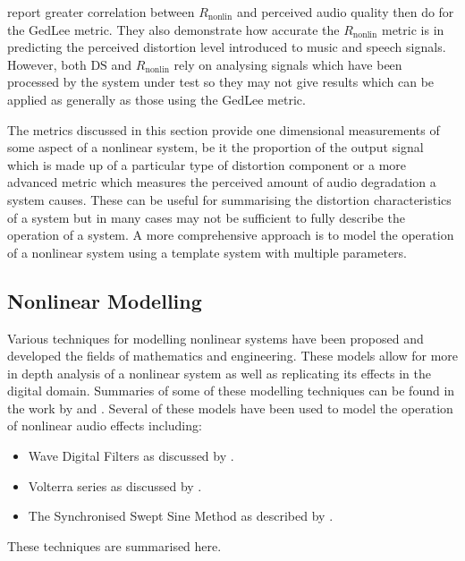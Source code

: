 			\citet{tan2004predicting} report greater correlation between $R_{\mathrm{nonlin}}$ and perceived
			audio quality then \citet{lee2003auditory} do for the GedLee metric. They also demonstrate how
			accurate the $R_{\mathrm{nonlin}}$ metric is in predicting the perceived distortion level introduced
			to music and speech signals. However, both $\mathrm{DS}$ and $R_{\mathrm{nonlin}}$ rely on analysing
			signals which have been processed by the system under test so they may not give results which can be
			applied as generally as those using the GedLee metric.

			The metrics discussed in this section provide one dimensional measurements of some aspect of a
			nonlinear system, be it the proportion of the output signal which is made up of a particular type of
			distortion component or a more advanced metric which measures the perceived amount of audio
			degradation a system causes. These can be useful for summarising the distortion characteristics of a
			system but in many cases may not be sufficient to fully describe the operation of a system. A more
			comprehensive approach is to model the operation of a nonlinear system using a template system with
			multiple parameters.

	\subsection{Nonlinear Modelling}
	\label{sec:Excitation-Analysis-Modelling}
		Various techniques for modelling nonlinear systems have been proposed and developed the fields of
		mathematics and engineering. These models allow for more in depth analysis of a nonlinear system as well as
		replicating its effects in the digital domain. Summaries of some of these modelling techniques can be found
		in the work by \citet{janczak2005identification} and \citet{ogunfunmi2007adaptive}. Several of these models
		have been used to model the operation of nonlinear audio effects including:

		\begin{itemize}
			\item Wave Digital Filters as discussed by \citet{fettweis1986wave}.
			\item Volterra series as discussed by \citet{reed1996practical}.
			\item The Synchronised Swept Sine Method as described by \citet{novak2010nonlinear}.
		\end{itemize}

		These techniques are summarised here.

